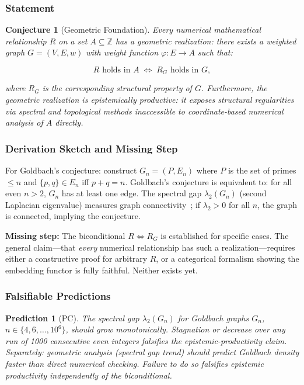 \documentclass[12pt]{article}
\theoremstyle{lawstyle}
\theoremstyle{conjstyle}
\newtheorem{conjecture}{Conjecture}[section]
\theoremstyle{predstyle}
\newtheorem{prediction}{Prediction}
\begin{document}
\subsubsection*{Statement}

\begin{conjecture}[Geometric Foundation]
Every numerical mathematical relationship $R$ on a set $A \subseteq \mathbb{Z}$ has a
geometric realization: there exists a weighted graph $G = (V, E, w)$ with weight function
$\varphi: E \to A$ such that:
\begin{conjbox}
\[
  R \text{ holds in } A \;\iff\; R_G \text{ holds in } G,
\]
\end{conjbox}
where $R_G$ is the corresponding structural property of $G$. Furthermore, the geometric
realization is \emph{epistemically productive}: it exposes structural regularities via
spectral and topological methods inaccessible to coordinate-based numerical analysis of
$A$ directly.
\end{conjecture}

\subsubsection*{Derivation Sketch and Missing Step}

For Goldbach's conjecture: construct $G_n = (P, E_n)$ where $P$ is the set of primes
$\leq n$ and $\{p,q\} \in E_n$ iff $p + q = n$. Goldbach's conjecture is equivalent to:
for all even $n > 2$, $G_n$ has at least one edge. The spectral gap
$\lambda_2(G_n)$ (second Laplacian eigenvalue) measures graph connectivity~\cite{spielman2007}; if
$\lambda_2 > 0$ for all $n$, the graph is connected, implying the conjecture.

\textbf{Missing step:} The biconditional $R \iff R_G$ is established for specific cases.
The general claim---that \emph{every} numerical relationship has such a realization---requires
either a constructive proof for arbitrary $R$, or a categorical formalism showing the
embedding functor is fully faithful. Neither exists yet.

\subsubsection*{Falsifiable Predictions}

\begin{prediction}[PC]
The spectral gap $\lambda_2(G_n)$ for Goldbach graphs $G_n$,
$n \in \{4, 6, \ldots, 10^6\}$, should grow monotonically. Stagnation or decrease over
any run of 1000 consecutive even integers falsifies the epistemic-productivity claim.
Separately: geometric analysis (spectral gap trend) should predict Goldbach density faster
than direct numerical checking. Failure to do so falsifies epistemic productivity
independently of the biconditional.
\end{prediction}
\end{document}
